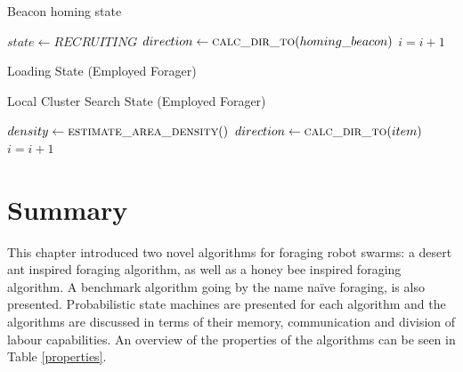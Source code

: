 \begin{algorithm}
\caption{Beacon homing state}
\label{algorithm:beaconhoming}
\begin{algorithmic}[1]
	\State $state \gets RECRUITING$
\EndIf
\State $direction \gets \Call{calc\_dir\_to}{homing\_beacon}$
\State {}
\State $i =i + 1$
\EndFunction
\end{algorithmic}
\end{algorithm}

\begin{algorithm}
\caption{Loading State (Employed Forager)}
\label{algorithm:loading}
\begin{algorithmic}[1]
	\State {}
\Else
\EndIf
\EndFunction
\end{algorithmic}
\end{algorithm}

\begin{algorithm}
\caption{Local Cluster Search State (Employed Forager)}
\label{algorithm:employedforager:localclustersearch}
\begin{algorithmic}[1]
		\State {}
		\State $density \gets \Call{estimate\_area\_density}{ }$
		\State $direction \gets \Call{calc\_dir\_to}{item}$
		\State {}
	\Else
		\State {}	
	\EndIf
\Else
\EndIf
\State $i =i + 1$
\EndFunction
\end{algorithmic}
\end{algorithm}


\section{Summary}
\label{prioritized:summary}

This chapter introduced two novel algorithms for foraging robot swarms: a desert ant inspired foraging algorithm, as well as a honey bee inspired foraging algorithm. A benchmark algorithm going by the name na\"ive foraging, is also presented. Probabilistic state machines are presented for each algorithm and the algorithms are discussed in terms of their memory, communication and division of labour capabilities. An overview of the properties of the algorithms can be seen in Table \ref{properties}.

